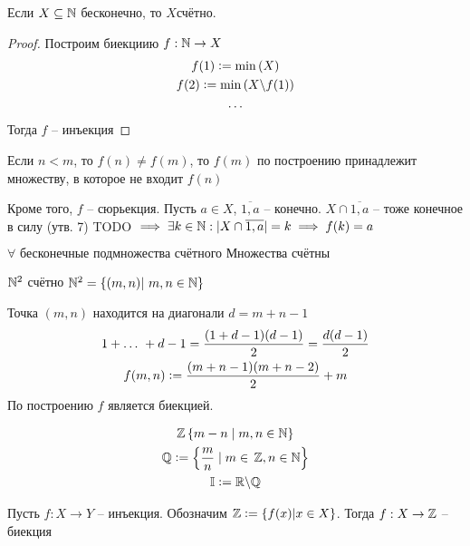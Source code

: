 \begin{proposition}
    Если $ X \subseteq \mathbb{N} $ бесконечно, то $ X $счётно.
\end{proposition}\begin{proof}
    Построим биекциию $ f: \mathbb{N} \to X $ \begin{gather}
        f(1)\vcentcolon= \min\left(X\right) \\
        f(2) \vcentcolon= \min\left(X\backslash f(1)\right) \\
        \dots 
    \end{gather}
    Тогда $ f $ -- инъекция
\end{proof}
\begin{proposition}
    Если $ n < m $, то $ f(n) \neq f(m) $, то $ f(m) $ по построению принадлежит множеству, в которое не входит $ f(n) $
\end{proposition}
Кроме того, $ f $ -- сюрьекция.
Пусть $ a \in X $, $ \overline{1,a} $ -- конечно. $ X \cap \overline{1, a} $ -- тоже конечное в силу (утв. 7) TODO $ \implies \exists k \in  \mathbb{N}: |X \cap \overline{1, a}| = k \implies  f(k) = a $
\begin{proposition}
    $ \forall \text{ бесконечные подмножества счётного Множества счётны } $
\end{proposition}
\begin{proposition}
    $ \mathbb{N}^2 $ счётно $ \mathbb{N}^2 = \{(m, n)|\ m, n \in \mathbb{N}\} $
\end{proposition}
Точка $ (m, n) $ находится на диагонали $ d = m + n - 1 $ \begin{gather}
    1 + \dots\ + d - 1 = \dfrac{(1 + d - 1)(d - 1)}{2} = \dfrac{d(d - 1)}{2} \\
    f(m, n)\vcentcolon= \dfrac{(m + n - 1)(m + n - 2)}{2} + m
\end{gather}
По построению $ f $ является биекцией.
\begin{note}
    \begin{gather}
        \mathbb{Z}  \left\{m - n \;\vert\; m, n \in \mathbb{N} \right\} \\
        \mathbb{Q} \vcentcolon= \left\{ \frac{m}{n} \;\vert\; m \in\, \mathbb{Z}, n \in \mathbb{N} \right\} \\
        \mathbb{I} \vcentcolon= \mathbb{R} \backslash \mathbb{Q}
    \end{gather}
\end{note}
\begin{proposition}
    Пусть $ f : X \to Y $ -- инъекция. Обозначим $ \mathbb{Z}\vcentcolon= \{f(x) | x \in X\}$. Тогда $ f: X \to \mathbb{Z} $ -- биекция
\end{proposition}
